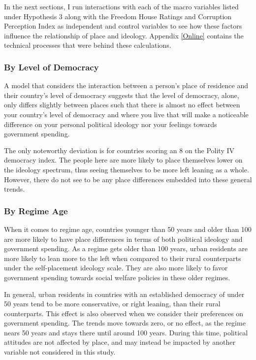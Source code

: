 \documentclass[12pt, titlepage]{article}
\begin{document}
In the next sections, I run interactions with each of the macro variables listed under Hypothesis 3 along with the  Freedom House Ratings and Corruption Perception Index as independent and control variables to see how these factors influence the relationship of place and ideology. Appendix \ref{Online} contains the technical processes that were behind these calculations. 

\subsubsection{By Level of Democracy}

A model that considers the interaction between a person's place of residence and their country's level of democracy suggests that the level of democracy, alone, only differs slightly between places such that there is almost no effect between your country's level of democracy and where you live that will make a noticeable difference on your personal political ideology nor your feelings towards government spending.

The only noteworthy deviation is for countries scoring an 8 on the Polity IV democracy index. The people here are more likely to place themselves lower on the ideology spectrum, thus seeing themselves to be more left leaning as a whole. However, there do not see to be any place differences embedded into these general trends. 

\subsubsection{By Regime Age}

When it comes to regime age, countries younger than 50 years and older than 100 are more likely to have place differences in terms of both political ideology and government spending. As a regime gets older than 100 years, urban residents are more likely to lean more to the left when compared to their rural counterparts under the self-placement ideology scale. They are also more likely to favor government spending towards social welfare policies in these older regimes. 

In general, urban residents in countries with an established democracy of under 50 years tend to be more conservative, or right leaning, than their rural counterparts. This effect is also observed when we consider their preferences on government spending. The trends move towards zero, or no effect, as the regime nears 50 years and stays there until around 100 years. During this time, political attitudes are not affected by place, and may instead be impacted by another variable not considered in this study.
\end{document}
